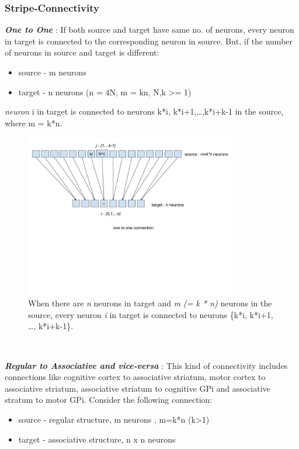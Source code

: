 \documentclass[11pt]{article}
\begin{document}
\subsubsection{Stripe-Connectivity} 
\textbf{\emph{One to One}} : If both source and target have same no. of neurons, every neuron in target is connected to the corresponding neuron in source. But, if the number of neurons in source and target is different: 
\begin{itemize}
  \item source - m neurons
  \item target - n neurons (n = 4N, m = kn, {N,k} >= 1)
\end{itemize}  
  \emph{neuron} i in target is connected to neurons {k*i, k*i+1,\ldots,k*i+k-1} in the source, where m = k*n.
\begin{figure}[h]
\begin{center}
\includegraphics[trim={0 10cm 0 0},clip,width=0.85\textwidth]{OnetoOne.jpg}
\caption[One to One connectivity]{When there are \emph{n} neurons in target and \emph{m (= k * n)} neurons in the source, every neuron \emph{i} in target is connected to neurons \{k*i, k*i+1, \ldots, k*i+k-1\}.}
\end{center}
\end{figure}
\\
\par
\textbf{\emph{Regular to Associative and vice-versa}} : This kind of connectivity includes connections like cognitive cortex to associative striatum, motor cortex to associative striatum, associative striatum to cognitive GPi and associative stratum to motor GPi. Consider the following connection:
\begin{itemize}
  \item source - regular structure, m neurons , m=k*n (k>1)
  \item target - associative structure, n x n neurons
\end{itemize}  
\end{document}
